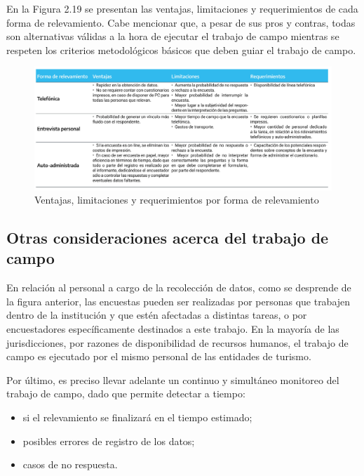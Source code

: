 \documentclass[
]{book}
\begin{document}
En la Figura 2.19 se presentan las ventajas, limitaciones y requerimientos de cada forma de relevamiento. Cabe mencionar que, a pesar de sus pros y contras, todas son alternativas válidas a la hora de ejecutar el trabajo de campo mientras se respeten los criterios metodológicos básicos que deben guiar el trabajo de campo.

\begin{figure}

{\centering \includegraphics[width=1\linewidth]{imagenes/tabla_6} 

}

\caption{Ventajas, limitaciones y requerimientos por forma de relevamiento}\label{fig:relevamiento}
\end{figure}

\hypertarget{otras-consideraciones-acerca-del-trabajo-de-campo}{%
\subsection{Otras consideraciones acerca del trabajo de campo}\label{otras-consideraciones-acerca-del-trabajo-de-campo}}

En relación al personal a cargo de la recolección de datos, como se desprende de la figura anterior, las encuestas pueden ser realizadas por personas que trabajen dentro de la institución y que estén afectadas a distintas tareas, o por encuestadores específicamente destinados a este trabajo. En la mayoría de las jurisdicciones, por razones de disponibilidad de recursos humanos, el trabajo de campo es ejecutado por el mismo personal de las entidades de turismo.

Por último, es preciso llevar adelante un continuo y simultáneo monitoreo del trabajo de campo, dado que permite detectar a tiempo:

\begin{itemize}
\item
  si el relevamiento se finalizará en el tiempo estimado;
\item
  posibles errores de registro de los datos;
\item
  casos de no respuesta.
\end{itemize}
\end{document}
